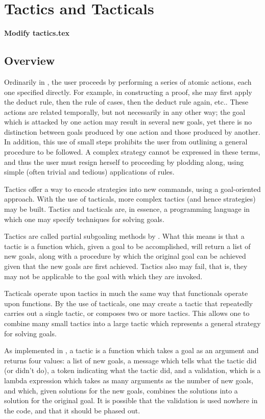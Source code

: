 \chapter{Tactics and Tacticals}

{\bf Modify tactics.tex}  

\section{Overview}

Ordinarily in \tps, the user proceeds by performing a series of
atomic actions, each one specified directly.  For example, in constructing
a proof, she may first apply the deduct rule, then the rule of cases, then
the deduct rule again, etc..  These actions are related temporally, but
not necessarily in any other way; the goal which is attacked by 
one action may result in several new goals, yet there is no distinction
between goals produced by one action and those produced by another.  
In addition, this use of small steps prohibits the user from outlining
a general procedure
to be followed.  A complex strategy cannot be expressed in these terms, 
and thus
the user must resign herself to proceeding by plodding along, using simple
(often trivial and tedious) applications of rules.

Tactics offer a way to encode strategies into new commands, using a 
goal-oriented approach.  With the use of tacticals, more complex tactics
(and hence strategies) may be built.  Tactics and tacticals are, in essence,
a programming language in which one may specify techniques for solving
goals.

Tactics are called  partial subgoaling methods by
\cite{Gordon79}.  What this means is that a tactic is a
function which, given a goal to be accomplished,
will return a list of new goals, along with a procedure by which the
original goal can be achieved given that the new goals are first
achieved.  Tactics also may fail, that is, they may not be applicable
to the goal with which they are invoked.

Tacticals operate upon tactics in much the same way that functionals
operate upon functions.  By the use of tacticals, one may create
a tactic that repeatedly carries out a single tactic, or composes
two or more tactics.  This allows one to combine many small tactics
into a large tactic which represents a general strategy for solving goals.

As implemented in \tps, a tactic is a function which takes a goal
as an argument and returns four values: a list of new goals, a message
which tells what the tactic did (or didn't do), a token indicating what
the tactic did, and a validation, which is a lambda expression which takes
as many arguments as the number of new goals, and which, given solutions
for the new goals, combines the solutions into a solution for the original
goal. It is possible that the validation is used nowhere in the code, and
that it should be phased out.

